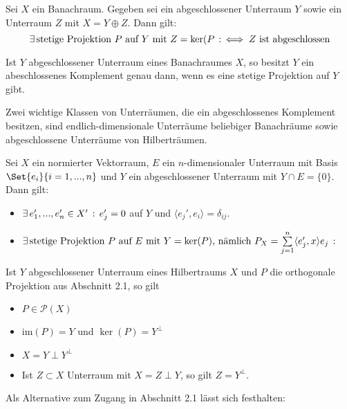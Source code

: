 \documentclass{cheat-sheet}
\begin{document}
\begin{satz}
  Sei $X$ ein Banachraum. Gegeben sei ein abgeschlossener Unterraum $Y$ sowie ein Unterraum $Z$ mit $X = Y \oplus Z$. Dann gilt:
  \[ \exists \, {\text{stetige Projektion $P$ auf $Y$ mit $Z = \ker(P$}} \,:\, \iff Z \text{ ist abgeschlossen} \]
\end{satz}

\begin{bem}
  Ist $Y$ abgeschlossener Unterraum eines Banachraumes $X$, so besitzt $Y$ ein abeschlossenes Komplement genau dann, wenn es eine stetige Projektion auf $Y$ gibt.
\end{bem}

Zwei wichtige Klassen von Unterräumen, die ein abgeschlossenes Komplement besitzen, sind endlich-dimensionale Unterräume beliebiger Banachräume sowie abgeschlossene Unterräume von Hilberträumen.



\begin{satz}
  Sei $X$ ein normierter Vektorraum, $E$ ein $n$-dimensionaler Unterraum mit Basis $\Set{ e_i }{ i = 1, ..., n }$ und $Y$ ein abgeschlossener Unterraum mit $Y \cap E = \{ 0 \}$. Dann gilt:
  \begin{itemize}
    \item $\exists \, {e_1', ..., e_n' \in X'} \,:\, e_j' = 0$ auf $Y$ und $\langle e_j', e_i \rangle = \delta_{ij}$.
    \item $\ex{\text{stetige Projektion $P$ auf $E$ mit $Y = \ker (P)$, nämlich $P_X = \sum_{j=1}^n \langle e_j', x \rangle e_j$}}$
  \end{itemize}
\end{satz}

\begin{lem}
  Ist $Y$ abgeschlossener Unterraum eines Hilbertraums $X$ und $P$ die orthogonale Projektion aus Abschnitt 2.1, so gilt
  \begin{itemize}
    \item $P \in \mathcal{P}(X)$
    \item $\mathrm{im}(P) = Y$ und $\ker (P) = Y^\perp$
    \item $X = Y \perp Y^\perp$
    \item Ist $Z \subset X$ Unterraum mit $X = Z \perp Y$, so gilt $Z = Y^\perp$.
  \end{itemize}
\end{lem}

Als Alternative zum Zugang in Abschnitt 2.1 lässt sich festhalten:
\end{document}
